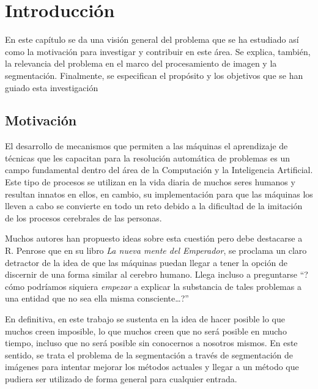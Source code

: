 \documentclass[main]{subfiles}
\begin{document}
\chapter{Introducción}

En este capítulo se da una visión general del problema que se ha estudiado así como la motivación para investigar y contribuir en este área. Se explica, también, la relevancia del problema en el marco del procesamiento de imagen y la segmentación. Finalmente, se especifican el propósito y los objetivos que se han guiado esta investigación


\section{Motivación}\label{sec:motivacion}

El desarrollo de mecanismos que permiten a las máquinas el aprendizaje de técnicas que les capacitan para la resolución automática de problemas es un campo fundamental dentro del área de la Computación y la Inteligencia Artificial. Este tipo de procesos se utilizan en la vida diaria de muchos seres humanos y resultan innatos en ellos, en cambio, su implementación para que las máquinas los lleven a cabo se convierte en todo un reto debido a la dificultad de la imitación de los procesos cerebrales de las personas.

Muchos autores \cite{lib:ross, lib:boden, art:searle, art:churchland} han propuesto ideas sobre esta cuestión pero debe destacarse a R. Penrose \cite{lib:penrose} que en su libro {\em La nueva mente del Emperador},  se proclama un claro detractor de la idea de que las máquinas puedan llegar a tener la opción de discernir de una forma similar al cerebro humano. Llega incluso a preguntarse ``?cómo podríamos siquiera {\em empezar} a explicar la substancia de tales problemas a una entidad que no sea ella misma consciente\dots?''

En definitiva, en este trabajo se sustenta en la idea de hacer posible lo que muchos creen imposible, lo que muchos creen que no será posible en mucho tiempo, incluso que no será posible sin conocernos a nosotros mismos. En este sentido, se trata el problema de la segmentación a través de segmentación de imágenes para intentar mejorar los métodos actuales y llegar a un método que pudiera ser utilizado de forma general para cualquier entrada.


\end{document}
